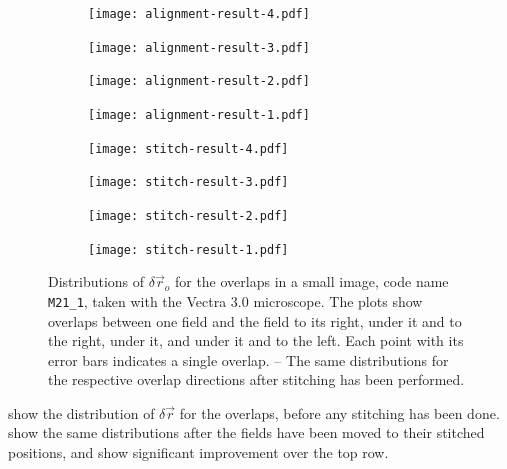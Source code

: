\documentclass{article}
\newcommand{\M}[2]{\texttt{M#1\_#2}}
\begin{document}
\begin{figure}[ht]
	\centering
	\begin{subfigure}{0.24\linewidth}
		\texttt{[image: alignment-result-4.pdf]}
		\caption{}
		\label{fig:alignmentresult4}
	\end{subfigure}
	\begin{subfigure}{0.24\linewidth}
		\texttt{[image: alignment-result-3.pdf]}
		\caption{}
		\label{fig:alignmentresult3}
	\end{subfigure}
	\begin{subfigure}{0.24\linewidth}
		\texttt{[image: alignment-result-2.pdf]}
		\caption{}
		\label{fig:alignmentresult2}
	\end{subfigure}
	\begin{subfigure}{0.24\linewidth}
		\texttt{[image: alignment-result-1.pdf]}
		\caption{}
		\label{fig:alignmentresult1}
	\end{subfigure}
	\begin{subfigure}{0.24\linewidth}
		\texttt{[image: stitch-result-4.pdf]}
		\caption{}
		\label{fig:stitchresult4}
	\end{subfigure}
	\begin{subfigure}{0.24\linewidth}
		\texttt{[image: stitch-result-3.pdf]}
		\caption{}
		\label{fig:stitchresult3}
	\end{subfigure}
	\begin{subfigure}{0.24\linewidth}
		\texttt{[image: stitch-result-2.pdf]}
		\caption{}
		\label{fig:stitchresult2}
	\end{subfigure}
	\begin{subfigure}{0.24\linewidth}
		\texttt{[image: stitch-result-1.pdf]}
		\caption{}
		\label{fig:stitchresult1}
	\end{subfigure}
	\caption{Distributions of $\delta\vec{r}_o$ for the overlaps in a small image, code name \M{21}1, taken with the Vectra 3.0 microscope.  The plots show overlaps between one field and the field  to its right,  under it and to the right,  under it, and  under it and to the left.  Each point with its error bars indicates a single overlap.  -- The same distributions for the respective overlap directions after stitching has been performed.}
	\label{fig:alignmentresults}
\end{figure}

 show the distribution of $\delta\vec{r}$ for the overlaps, before any stitching has been done.   show the same distributions after the fields have been moved to their stitched positions, and show significant improvement over the top row.
\end{document}
